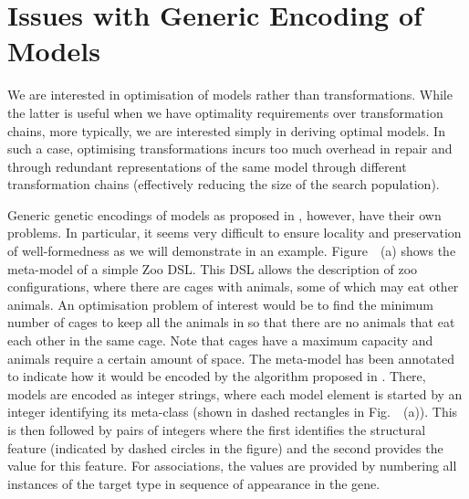 \section{Issues with Generic Encoding of Models}
\label{section:issues}


  We are interested in optimisation of models rather than transformations. While the latter is useful when we have optimality requirements over transformation
	chains, more typically, we are interested simply in deriving optimal models. In such a case, optimising transformations incurs too much overhead in repair and
	through redundant representations of the same model through different transformation chains (effectively reducing the size of the search population).
	
	Generic genetic encodings of models as proposed in \cite{Kessentini+13,Williams13,Efstathiou+14b}, however, have their own problems. In particular, it seems very
	difficult to ensure locality and preservation of well-formedness as we will demonstrate in an example. Figure~~(a) shows the meta-model of a
	simple Zoo DSL. This DSL allows the description of zoo configurations, where there are cages with animals, some of which may eat other animals. An optimisation
	problem of interest would be to find the minimum number of cages to keep all the animals in so that there are no animals that eat each other in the same cage.
	Note that cages have a maximum capacity and animals require a certain amount of space. The meta-model has been annotated to indicate how it would be encoded by the
	algorithm proposed in \cite{Williams13}. There, models are encoded as integer strings, where each model element is started by an integer identifying its 
	meta-class (shown in dashed rectangles in Fig.~~(a)). This is then followed by pairs of integers where the first identifies the structural
	feature (indicated by dashed circles in the figure) and the second provides the value for this feature. For associations, the values are provided by numbering
	all instances of the target type in sequence of appearance in the gene.
	
